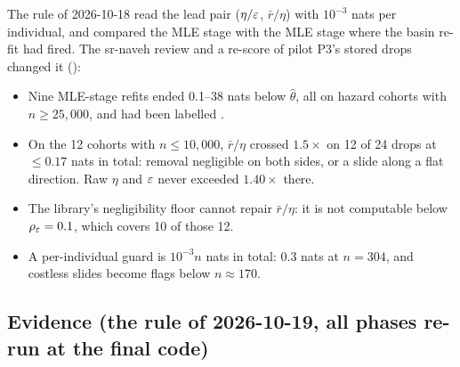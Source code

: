 The rule of 2026-10-18 read the lead pair ($\eta/\varepsilon$, $\bar r/\eta$) with $10^{-3}$ nats per individual, and compared
the MLE stage with the MLE stage where the basin re-fit had fired. The sr-naveh review and a re-score of pilot P3's
stored drops changed it ():
\begin{itemize}[nosep]
  \item Nine MLE-stage refits ended 0.1--38 nats below $\hat\theta$, all on hazard cohorts with $n\ge25{,}000$, and had
    been labelled .
  \item On the 12 cohorts with $n\le10{,}000$, $\bar r/\eta$ crossed $1.5\times$ on 12 of 24 drops at $\le0.17$ nats in
    total: removal negligible on both sides, or a slide along a flat direction. Raw $\eta$ and $\varepsilon$ never exceeded
    $1.40\times$ there.
  \item The library's negligibility floor cannot repair $\bar r/\eta$: it is not computable below $\rho_\varepsilon=0.1$, which
    covers 10 of those 12.
  \item A per-individual guard is $10^{-3}n$ nats in total: 0.3 nats at $n=304$, and costless slides become flags below
    $n\approx170$.
\end{itemize}

\subsection{Evidence (the rule of 2026-10-19, all phases re-run at the final code)}\label{sec:lev-evidence}

